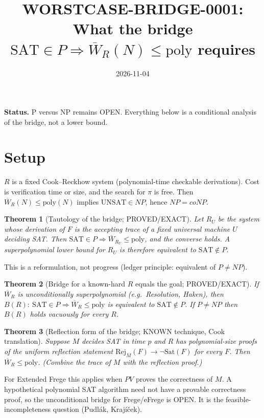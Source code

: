 \documentclass{article}
\title{WORSTCASE-BRIDGE-0001: What the bridge $\mathrm{SAT}\in P\Rightarrow \overline W_R(N)\le\mathrm{poly}$ requires}
\date{2026-11-04}
\newtheorem{theorem}{Theorem}
\begin{document}
\maketitle
\noindent\textbf{Status.} P versus NP remains OPEN. Everything below is a conditional analysis of the bridge, not a lower bound.

\section*{Setup}
$R$ is a fixed Cook--Reckhow system (polynomial-time checkable derivations). Cost is verification time or size, and the search for $\pi$ is free. Then $\overline W_R(N)\le \mathrm{poly}(N)$ implies $\mathrm{UNSAT}\in NP$, hence $NP=coNP$.

\begin{theorem}[Tautology of the bridge; PROVED/EXACT]
Let $R_U$ be the system whose derivation of $F$ is the accepting trace of a fixed universal machine $U$ deciding SAT. Then $\mathrm{SAT}\in P\Rightarrow \overline W_{R_U}\le\mathrm{poly}$, and the converse holds. A superpolynomial lower bound for $R_U$ is therefore equivalent to $\mathrm{SAT}\notin P$.
\end{theorem}
\noindent This is a reformulation, not progress (ledger principle: equivalent of $P\neq NP$).

\begin{theorem}[Bridge for a known-hard $R$ equals the goal; PROVED/EXACT]
If $\overline W_R$ is unconditionally superpolynomial (e.g.\ Resolution, Haken), then $B(R):\ \mathrm{SAT}\in P\Rightarrow\overline W_R\le\mathrm{poly}$ is equivalent to $\mathrm{SAT}\notin P$. If $P\neq NP$ then $B(R)$ holds vacuously for every $R$.
\end{theorem}

\begin{theorem}[Reflection form of the bridge; KNOWN technique, Cook translation]
Suppose $M$ decides SAT in time $p$ and $R$ has polynomial-size proofs of the uniform reflection statement $\mathrm{Rej}_M(F)\to\neg\mathrm{Sat}(F)$ for every $F$. Then $\overline W_R\le\mathrm{poly}$. (Combine the trace of $M$ with the reflection proof.)
\end{theorem}
\noindent For Extended Frege this applies when $PV$ proves the correctness of $M$. A hypothetical polynomial SAT algorithm need not have a provable correctness proof, so the unconditional bridge for Frege/eFrege is OPEN. It is the feasible-incompleteness question (Pudl\'ak, Kraj\'i\v cek).
\end{document}
